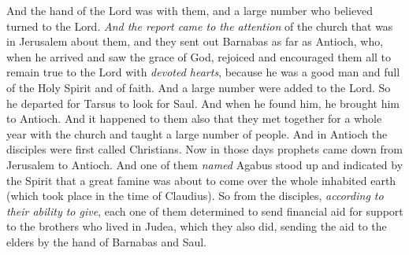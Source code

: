 \begin{biblechapter}
\verse And the hand of the Lord was with them, and a large number who believed turned to the Lord.
\verse \textit{And the report came to the attention} of the church that was in Jerusalem about them, and they sent out Barnabas as far as Antioch,
\verse who, when he arrived and saw the grace of God, rejoiced and encouraged them all to remain true to the Lord with \textit{devoted hearts},
\verse because he was a good man and full of the Holy Spirit and of faith. And a large number were added to the Lord.
\verse So he departed for Tarsus to look for Saul.
\verse And when he found him, he brought him to Antioch. And it happened to them also that they met together for a whole year with the church and taught a large number of people. And in Antioch the disciples were first called Christians.
\verse Now in those days prophets came down from Jerusalem to Antioch.
\verse And one of them \textit{named} Agabus stood up and indicated by the Spirit that a great famine was about to come over the whole inhabited earth (which took place in the time of Claudius).
\verse So from the disciples, \textit{according to their ability to give}, each one of them determined to send financial aid for support to the brothers who lived in Judea,
\verse which they also did, sending the aid to the elders by the hand of Barnabas and Saul.
\end{biblechapter}

